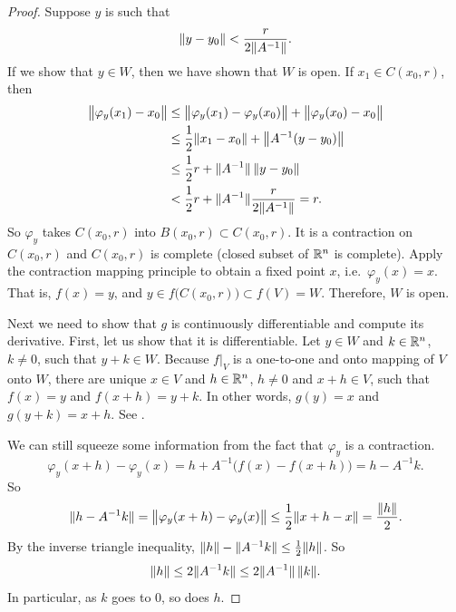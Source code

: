 \begin{proof}
Suppose $y$ is such that
\begin{equation*}
\lVert {y-y_0} \rVert <
\frac{r}{2\lVert {A^{-1}} \rVert} .
\end{equation*}
If we show that $y \in W$, then we have shown that $W$ is open.
If $x_1 \in
C(x_0,r)$, then
\begin{equation*}
\begin{split}
\bigl\lVert {\varphi_y(x_1)-x_0} \bigr\rVert
& \leq
\bigl\lVert {\varphi_y(x_1)-\varphi_y(x_0)} \bigr\rVert +
\bigl\lVert {\varphi_y(x_0)-x_0} \bigr\rVert \\
& \leq
\frac{1}{2}\lVert {x_1-x_0} \rVert +
\bigl\lVert {A^{-1}(y-y_0)} \bigr\rVert \\
& \leq
\frac{1}{2}r +
\lVert {A^{-1}} \rVert \, \lVert {y-y_0} \rVert \\
& <
\frac{1}{2}r +
\lVert {A^{-1}} \rVert
\frac{r}{2\lVert {A^{-1}} \rVert} = r .
\end{split}
\end{equation*}
So $\varphi_y$ takes $C(x_0,r)$ into $B(x_0,r) \subset C(x_0,r)$.  It is a
contraction on $C(x_0,r)$ and $C(x_0,r)$ is complete (closed subset of ${\mathbb{R}}^n$
is complete).
Apply the contraction mapping principle to obtain a fixed point $x$,
i.e.\ $\varphi_y(x) = x$.  That is, $f(x) = y$, and $y \in
f\bigl(C(x_0,r)\bigr) \subset f(V) = W$.  Therefore, $W$ is open.

Next we need to show that $g$ is continuously differentiable and compute
its derivative.  First, let us show that it is differentiable.
Let $y \in W$ and $k \in {\mathbb{R}}^n$, $k \neq 0$, such that $y+k \in W$.
Because $f|_V$ is a one-to-one and onto mapping of $V$ onto $W$,
there are unique
$x \in V$ and $h \in {\mathbb{R}}^n$, $h \neq 0$ and $x+h \in V$, such that
$f(x) = y$ and $f(x+h) = y+k$.
In other words, $g(y) = x$ and $g(y+k) = x+h$.  See
.
\begin{myfigureht}
\caption{Proving that $g$ is differentiable.\label{fig:inversefuncRn2}}
\end{myfigureht}

We can still
squeeze some information from the fact that $\varphi_y$ is a contraction.
\begin{equation*}
\varphi_y(x+h)-\varphi_y(x) = h + A^{-1} \bigl( f(x)-f(x+h) \bigr) = h - A^{-1} k .
\end{equation*}
So
\begin{equation*}
\lVert {h-A^{-1}k} \rVert = \bigl\lVert {\varphi_y(x+h)-\varphi_y(x)} \bigr\rVert \leq
\frac{1}{2}\lVert {x+h-x} \rVert = \frac{\lVert {h} \rVert}{2}.
\end{equation*}
By the inverse triangle inequality, $\lVert {h} \rVert - \lVert {A^{-1}k} \rVert \leq
\frac{1}{2}\lVert {h} \rVert$.
So
\begin{equation*}
\lVert {h} \rVert \leq 2 \lVert {A^{-1}k} \rVert \leq 2 \lVert {A^{-1}} \rVert \, \lVert {k} \rVert.
\end{equation*}
In particular, as $k$ goes to 0, so does $h$.


\end{proof}
